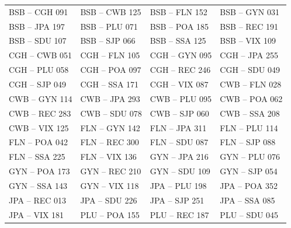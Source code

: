 \documentclass{endm}
\begin{document}
\begin{center}

\renewcommand{\arraystretch}{0.6}

\label {tabela2}
\begin{longtable}{llll} 

\scriptsize BSB – CGH  091 & \scriptsize BSB – CWB  125 & \scriptsize BSB – FLN  152 & \scriptsize BSB – GYN  031\\
\scriptsize BSB – JPA  197 & \scriptsize BSB – PLU  071 & \scriptsize BSB – POA  185 & \scriptsize BSB – REC  191\\
\scriptsize BSB – SDU  107 & \scriptsize BSB – SJP  066 & \scriptsize BSB – SSA  125 & \scriptsize BSB – VIX  109\\
\scriptsize CGH – CWB  051 & \scriptsize CGH – FLN  105 & \scriptsize CGH – GYN  095 & \scriptsize CGH – JPA  255\\
\scriptsize CGH – PLU  058 & \scriptsize CGH – POA  097 & \scriptsize CGH – REC  246 & \scriptsize CGH – SDU  049\\
\scriptsize CGH – SJP  049 & \scriptsize CGH – SSA  171 & \scriptsize CGH – VIX  087 & \scriptsize CWB – FLN  028\\	
\scriptsize CWB – GYN  114 & \scriptsize CWB – JPA  293 & \scriptsize CWB – PLU  095 & \scriptsize CWB – POA  062\\
\scriptsize CWB – REC  283 & \scriptsize CWB – SDU  078 & \scriptsize CWB – SJP  060 & \scriptsize CWB – SSA  208\\	
\scriptsize CWB – VIX  125 & \scriptsize FLN – GYN  142 & \scriptsize FLN – JPA  311 & \scriptsize FLN – PLU  114\\	
\scriptsize FLN – POA  042 & \scriptsize FLN – REC  300 & \scriptsize FLN – SDU  087 & \scriptsize FLN – SJP  088\\	
\scriptsize FLN – SSA  225 & \scriptsize FLN – VIX  136 & \scriptsize GYN – JPA  216 & \scriptsize GYN – PLU  076	\\
\scriptsize GYN – POA  173 & \scriptsize GYN – REC  210 & \scriptsize GYN – SDU  109 & \scriptsize GYN – SJP  054\\	
\scriptsize GYN – SSA  143 & \scriptsize GYN – VIX  118 & \scriptsize JPA – PLU  198 & \scriptsize JPA – POA  352\\	
\scriptsize JPA – REC  013 & \scriptsize JPA – SDU  226 & \scriptsize JPA – SJP  251 & \scriptsize JPA – SSA  085	\\
\scriptsize JPA – VIX  181	 & \scriptsize PLU – POA  155 & \scriptsize PLU – REC  187 & \scriptsize PLU – SDU  045	\\

\end{longtable}
\end{center}
\end{document}
